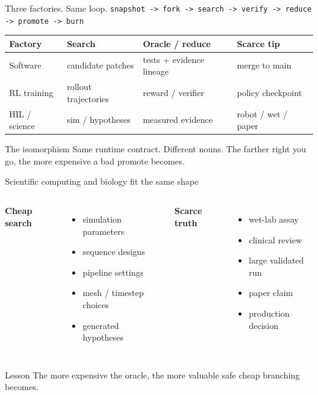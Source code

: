 \begin{frame}{Three factories. Same loop.}
\centering
\small
\texttt{snapshot -> fork -> search -> verify -> reduce -> promote -> burn}
\vspace{0.8em}
\normalsize
\begin{tabular}{p{}p{}p{}p{}}
\toprule
\textbf{Factory} & \textbf{Search} & \textbf{Oracle / reduce} & \textbf{Scarce tip} \\
\midrule
Software & candidate patches & tests + evidence lineage & merge to main \\
RL training & rollout trajectories & reward / verifier & policy checkpoint \\
HIL / science & sim / hypotheses & measured evidence & robot / wet / paper \\
\bottomrule
\end{tabular}
\vspace{0.8em}
\begin{block}{The isomorphism}
Same runtime contract. Different nouns. The farther right you go, the more expensive a bad promote becomes.
\end{block}
\end{frame}

\begin{frame}{Scientific computing and biology fit the same shape}
\begin{columns}[T,onlytextwidth]
\textbf{Cheap search}
\begin{itemize}
  \item simulation parameters
  \item sequence designs
  \item pipeline settings
  \item mesh / timestep choices
  \item generated hypotheses
\end{itemize}
\textbf{Scarce truth}
\begin{itemize}
  \item wet-lab assay
  \item clinical review
  \item large validated run
  \item paper claim
  \item production decision
\end{itemize}
\end{columns}
\vspace{0.7em}
\begin{block}{Lesson}
The more expensive the oracle, the more valuable safe cheap branching becomes.
\end{block}
\end{frame}

